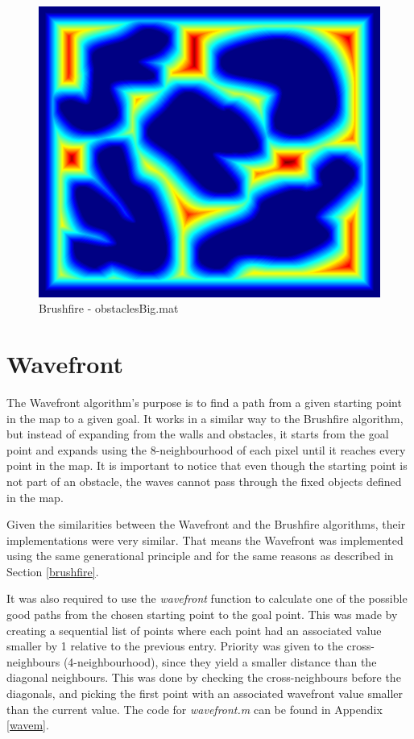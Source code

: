 \documentclass[journal]{IEEEtran}
\begin{document}
\begin{figure}\label{obstaclesBig_bf}
	\centering
	\includegraphics[width=0.8\linewidth]{figures/obstaclesBig_bf.png}
	\caption{Brushfire - obstaclesBig.mat}
\end{figure}



\section{Wavefront}\label{wavefront}

The Wavefront algorithm's purpose is to find a path from a given starting point in the map to a given goal. It works in a similar way to the Brushfire algorithm, but instead of expanding from the walls and obstacles, it starts from the goal point and expands using the 8-neighbourhood of each pixel until it reaches every point in the map. It is important to notice that even though the starting point is not part of an obstacle, the waves cannot pass through the fixed objects defined in the map.

Given the similarities between the Wavefront and the Brushfire algorithms, their implementations were very similar. That means the Wavefront was implemented using the same generational principle and for the same reasons as described in Section \ref{brushfire}.

It was also required to use the \textit{wavefront} function to calculate one of the possible good paths from the chosen starting point to the goal point. This was made by creating a sequential list of points where each point had an associated value smaller by 1 relative to the previous entry. Priority was given to the cross-neighbours (4-neighbourhood), since they yield a smaller distance than the diagonal neighbours. This was done by checking the cross-neighbours before the diagonals, and picking the first point with an associated wavefront value smaller than the current value. The code for \textit{wavefront.m} can be found in Appendix \ref{wavem}.
\end{document}

